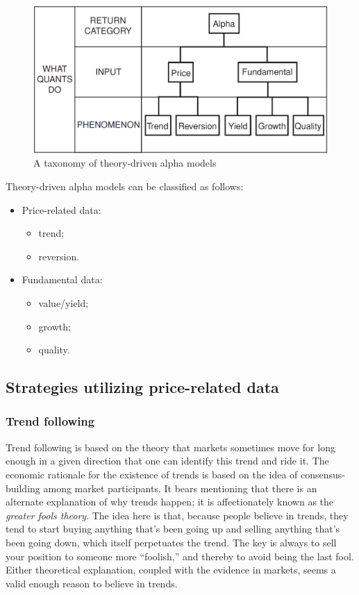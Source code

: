 \documentclass[11pt]{report}
\begin{document}
			\begin{figure}[htbp]
				\centering
				\includegraphics[width=.9\textwidth]{alphatheory.png}
				\caption{A taxonomy of theory-driven alpha models}
				\label{fig:alphatheory}
			\end{figure}

			Theory-driven alpha models can be classified as follows:
			\begin{itemize}
				\item Price-related data:
					\begin{itemize}
						\item trend;
						\item reversion.
					\end{itemize}
				\item Fundamental data:
					\begin{itemize}
						\item value/yield;
						\item growth;
						\item quality.
					\end{itemize}
			\end{itemize}

			\subsection{Strategies utilizing price-related data}

				\subsubsection{Trend following}

					Trend following is based on the theory that markets sometimes move for long enough in a given direction that one can identify this trend and ride it. The economic rationale for the existence of trends is based on the idea of consensus-building among market participants. It bears mentioning that there is an alternate explanation of why trends happen; it is affectionately known as the \textit{greater fools theory}. The idea here is that, because people believe in trends, they tend to start buying anything that's been going up and selling anything that's been going down, which itself perpetuates the trend. The key is always to sell your position to someone more ``foolish,'' and thereby to avoid being the last fool. Either theoretical explanation, coupled with the evidence in markets, seems a valid enough reason to believe in trends.
\end{document}
